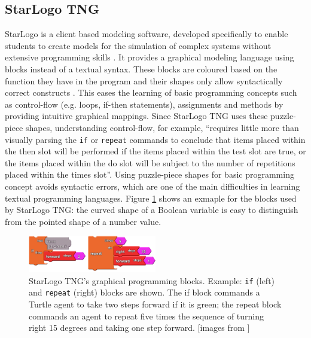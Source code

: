 \documentclass[runningheads,a4paper]{llncs}
\begin{document}
 \subsection{StarLogo TNG}
  StarLogo is a client based modeling software, developed specifically to enable students to 
  create models for the simulation of complex systems without extensive programming skills \cite{klopfer2009starlogo}.
  It provides a graphical modeling language using blocks instead of a textual syntax. 
  These blocks are coloured based on the function they have in the program and their shapes only allow syntactically correct constructs \cite{klopfer2009starlogo}.
  This eases the learning of basic programming concepts such as control-flow (e.g. loops, if-then statements),
  assignments and methods by providing intuitive graphical mappings. Since StarLogo TNG uses these puzzle-piece shapes, understanding 
  control-flow, for example, ``requires little more than visually parsing the \texttt{if} or \texttt{repeat} commands 
  to conclude that items placed within the then slot will be performed if the items placed within the 
  test slot are true, or the items placed within the do slot will be subject to the number of repetitions placed within the times slot''\cite{smith2011biology}.
  Using puzzle-piece shapes for basic programming concept avoids syntactic errors, 
  which are one of the main difficulties in learning textual programming languages.
  Figure \ref{fig1} shows an exmaple for the blocks used by StarLogo TNG: 
  the curved shape of a Boolean variable is easy to distinguish from the pointed shape of a number value.
  
  \begin{figure}[H]
	\centering
  \includegraphics[width=0.5\textwidth]{images/StarLogoTNGBlocksEx.PNG}
	\caption{ StarLogo TNG’s graphical programming blocks. Example: \texttt{if} (left) and \texttt{repeat} (right) blocks are shown. The
	  if block commands a Turtle agent to take two steps forward if it is green; the repeat block commands an agent to
	  repeat five times the sequence of turning right 15 degrees and taking one step forward. [images from \cite{smith2011biology}]}
	\label{fig1}
  \end{figure}
  
\end{document}
